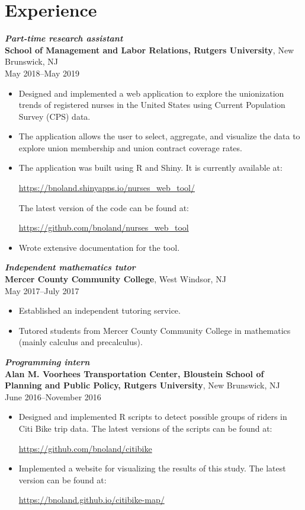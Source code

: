 \documentclass[letterpaper,12pt]{article}
\begin{document}
\section*{Experience}

\textit{\textbf{Part-time research assistant}} \\
\textbf{School of Management and Labor Relations, Rutgers University},
New Brunswick, NJ \\
May 2018--May 2019
\begin{itemize}
\item Designed and implemented a web application to explore the
  unionization trends of registered nurses in the United States using
  Current Population Survey (CPS) data.
\item The application allows the user to select, aggregate, and
  visualize the data to explore union membership and union contract
  coverage rates.
\item The application was built using R and Shiny. It is currently
  available at:
  \begin{center} \url{https://bnoland.shinyapps.io/nurses_web_tool/}
  \end{center} The latest version of the code can be found at:
  \begin{center} \url{https://github.com/bnoland/nurses_web_tool}
  \end{center}
\item Wrote extensive documentation for the tool.
\end{itemize}

\textit{\textbf{Independent mathematics tutor}} \\
\textbf{Mercer County Community College},
West Windsor, NJ \\
May 2017--July 2017
\begin{itemize}
\item Established an independent tutoring service.
\item Tutored students from Mercer County Community College in
  mathematics (mainly calculus and precalculus).
\end{itemize}

\textit{\textbf{Programming intern}} \\
\textbf{Alan M. Voorhees Transportation Center, Bloustein School of
  Planning and Public Policy, Rutgers University},
New Brunswick, NJ \\
June 2016--November 2016
\begin{itemize}
\item Designed and implemented R scripts to detect possible groups of
  riders in Citi Bike trip data. The latest versions of the scripts
  can be found at:
  \begin{center} \url{https://github.com/bnoland/citibike}
\end{center}

\item Implemented a website for visualizing the results of this
  study. The latest version can be found at:
  \begin{center} \url{https://bnoland.github.io/citibike-map/}
\end{center}

\end{itemize}
\end{document}
